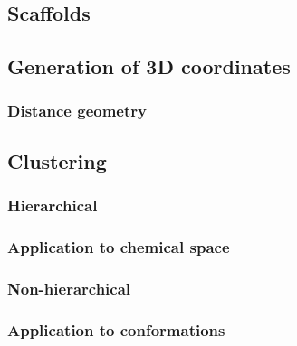\subsection{Scaffolds}

\subsection{Generation of 3D coordinates}

\subsubsection{Distance geometry}

\subsection{Clustering}

\subsubsection{Hierarchical}

\subsubsection{Application to chemical space}

\subsubsection{Non-hierarchical}

\subsubsection{Application to conformations}